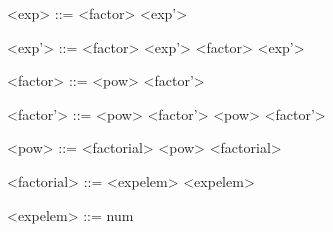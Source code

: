 \begin{grammarEx}
	<exp> ::= <factor> <exp'>
	
	<exp'> ::= \lit{+} <factor> <exp'>
	\alt \lit{-} <factor> <exp'>
	\alt \textepsilon{}

	<factor> ::= <pow> <factor'>
	
	<factor'> ::= \lit{*} <pow> <factor'>
	\alt \lit{/} <pow> <factor'>
	\alt \textepsilon{}

	<pow> ::= <factorial> \lit{\^{}} <pow>
	\alt <factorial>

	<factorial> ::= <exp\textunderscore elem> \lit{!}
	\alt <exp\textunderscore elem>

	<exp\textunderscore elem> ::= 
	\alt num
\end{grammarEx}